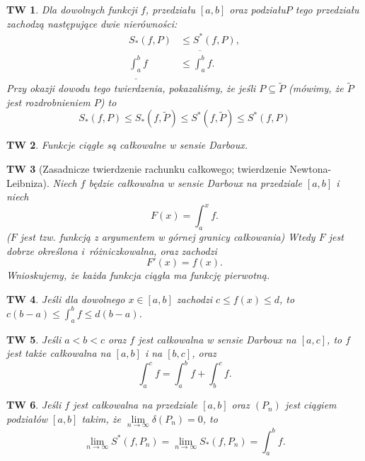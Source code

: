\documentclass[a4paper, 12pt]{mwart}
\theoremstyle{definition}
\theoremstyle{plain}
\newtheorem{twierdzenie}{TW}[section]
\theoremstyle{remark}
\newcommand{\upint}[2]{
	\overline{\int_{#1}^{#2}}
}
\newcommand{\loint}[2]{
	\underline{\int_{#1}^{#2}}
}
\begin{document}
\begin{twierdzenie}
	Dla dowolnych funkcji $f$, przedziału $[a, b]$ oraz podziału$P$ tego przedziału zachodzą następujące dwie nierówności:
	\begin{equation}
		\begin{aligned}
			S_*(f, P) &\leq S^*(f, P), \\
			\loint{a}{b} f &\leq \upint{a}{b} f.
		\end{aligned}
	\end{equation}
	Przy okazji dowodu tego twierdzenia, pokazaliśmy, że jeśli $P \subseteq \widetilde{P}$ (mówimy, że $\widetilde{P}$ jest \emph{rozdrobnieniem} $P$) to
	\begin{equation}
		S_*(f, P) \leq S_*(f, \widetilde{P}) \leq S^*(f, \widetilde{P}) \leq S^*(f, P)
	\end{equation}
\end{twierdzenie}
\begin{twierdzenie}
	Funkcje ciągłe są całkowalne w sensie Darboux.
\end{twierdzenie}
\begin{twierdzenie}[Zasadnicze twierdzenie rachunku całkowego; twierdzenie Newtona-Leibniza]
	Niech $f$ będzie całkowalna w sensie Darboux na przedziale $[a, b]$ i niech
	\begin{equation}
		F(x) = \int_a^x f.
	\end{equation}
	($F$ jest tzw. \emph{funkcją z argumentem w górnej granicy całkowania})
	Wtedy $F$ jest dobrze określona i~różniczkowalna, oraz zachodzi
	\begin{equation}
		F'(x) = f(x).
	\end{equation}
	Wnioskujemy, że każda funkcja ciągła ma funkcję pierwotną.
\end{twierdzenie}
\begin{twierdzenie}
	Jeśli dla dowolnego $x \in [a, b]$ zachodzi $c \leq f(x) \leq d$, to $c(b-a) \leq \int_a^b f \leq d(b-a)$.
\end{twierdzenie}
\begin{twierdzenie}
	Jeśli $a < b < c$ oraz $f$ jest całkowalna w sensie Darboux na $[a, c]$, to $f$ jest także całkowalna na $[a, b]$ i na $[b, c]$, oraz
	\begin{equation}
		\int_a^c f = \int_a^b f + \int_b^c f.
	\end{equation}
\end{twierdzenie}
\begin{twierdzenie}
	Jeśli $f$ jest całkowalna na przedziale $[a, b]$ oraz $(P_n)$ jest ciągiem podziałów $[a, b]$ takim, że $\lim\limits_{n \to\infty}\delta(P_n) = 0$, to
	\begin{equation}
		\lim_{n \to\infty} S^*(f, P_n) = \lim_{n \to\infty} S_*(f, P_n) = \int_a^b f.
	\end{equation}
\end{twierdzenie}
\end{document}
